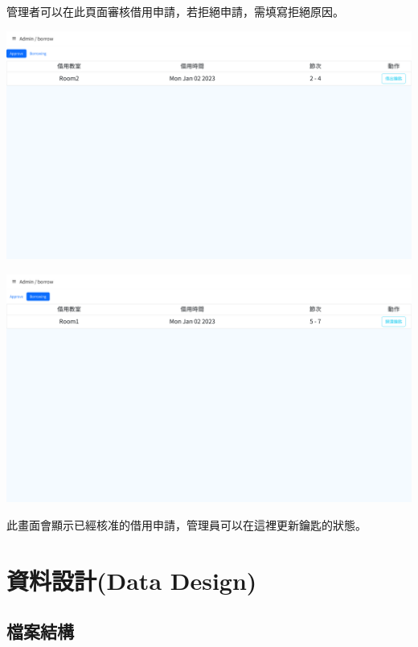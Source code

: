 \documentclass{article}
\begin{document}
管理者可以在此頁面審核借用申請，若拒絕申請，需填寫拒絕原因。

\pagebreak

\begin{center}
	\includegraphics[width=\linewidth]{AdminKeyApprove.png}

	\bigskip

	\includegraphics[width=\linewidth]{AdminKeyBorrowing.png}
\end{center}

此畫面會顯示已經核准的借用申請，管理員可以在這裡更新鑰匙的狀態。

\newpage

\section[資料設計(DATA DESIGN)]{資料設計(Data Design)}

\subsection{檔案結構}
\end{document}
